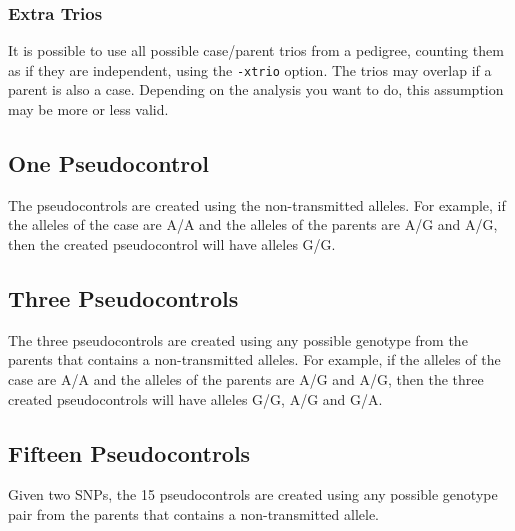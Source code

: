 \documentclass[a4paper,12pt]{article}
\newcommand{\code}[1]{{\footnotesize{{\tt #1}}}}
\begin{document}

\subsubsection{Extra Trios}
\label{extratrios}

It is possible to use all possible case/parent trios from a pedigree, counting them as if they are independent, using the \code{-xtrio} option. The trios may overlap if a parent is also a case. Depending on the analysis you want to do, this assumption may be more or less valid. 




\subsection{One Pseudocontrol}
\label{pseudocons1}

The pseudocontrols are created using the non-transmitted alleles. For example, if the alleles of the case are A/A and the alleles of the parents are A/G and A/G, then the created pseudocontrol will have alleles G/G. 


\subsection{Three Pseudocontrols}
\label{pseudocons3}

The three pseudocontrols are created using any possible genotype from the parents that contains a non-transmitted alleles. For example, if the alleles of the case are A/A and the alleles of the parents are A/G and A/G, then the three created pseudocontrols will have alleles G/G, A/G and G/A. 


\subsection{Fifteen Pseudocontrols}
\label{pseudocons15}

Given two SNPs, the 15 pseudocontrols are created using any possible genotype pair from the parents that contains a non-transmitted allele. 

\end{document}
